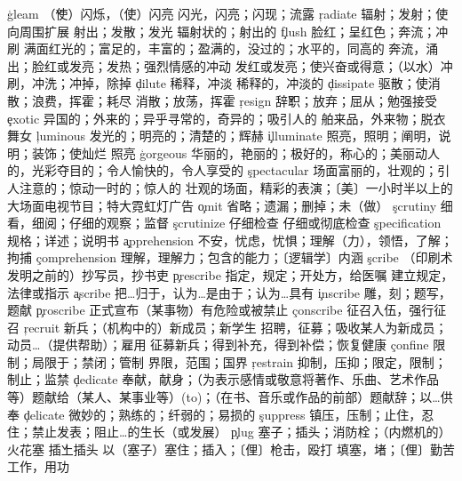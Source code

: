 \begin{multicols}{2}
\c{gleam}  \v （使）闪烁，（使）闪亮 \n 闪光，闪亮；闪现；流露
\c{radiate}  \vt 辐射；发射；使向周围扩展 \vi 射出；发散；发光 \a 辐射状的；射出的
\c{flush}  \vi 脸红；呈红色；奔流；冲刷 \a 满面红光的；富足的，丰富的；盈满的，没过的；水平的，同高的 \n 奔流，涌出；脸红或发亮；发热；强烈情感的冲动 \vt 发红或发亮；使兴奋或得意；（以水）冲刷，冲洗；冲掉，除掉
\c{dilute}  \vt 稀释，冲淡 \a 稀释的，冲淡的 
\c{dissipate}  \vt 驱散；使消散；浪费，挥霍；耗尽 \vi 消散；放荡，挥霍
\c{resign}  \v 辞职；放弃；屈从；勉强接受
\c{exotic}  \a 异国的；外来的；异乎寻常的，奇异的；吸引人的 \n 舶来品，外来物；脱衣舞女
\c{luminous}  \a 发光的；明亮的；清楚的；辉赫
\c{illuminate}  \vt 照亮，照明；阐明，说明；装饰；使灿烂 \vi 照亮
\c{gorgeous}  \a 华丽的，艳丽的；极好的，称心的；美丽动人的，光彩夺目的；令人愉快的，令人享受的
\c{spectacular}  \a 场面富丽的，壮观的；引人注意的；惊动一时的；惊人的 \n 壮观的场面，精彩的表演；〔美〕一小时半以上的大场面电视节目；特大霓虹灯广告
\c{omit}  \vt 省略；遗漏；删掉；未（做）
\c{scrutiny}  \n 细看，细阅；仔细的观察；监督
\c{scrutinize}  \vt 仔细检查 \n 仔细或彻底检查
\c{specification}  \n 规格；详述；说明书
\c{apprehension}  \n 不安，忧虑，忧惧；理解（力），领悟，了解；拘捕
\c{comprehension}  \n 理解，理解力；包含的能力；〔逻辑学〕内涵
\c{scribe}  \n （印刷术发明之前的）抄写员，抄书吏
\c{prescribe}  \vt 指定，规定；开处方，给医嘱 \vi 建立规定，法律或指示
\c{ascribe}  \vt 把…归于，认为…是由于；认为…具有 
\c{inscribe}  \vt 雕，刻；题写，题献
\c{proscribe}  \vt 正式宣布（某事物）有危险或被禁止
\c{conscribe}  \vt 征召入伍，强行征召
\c{recruit}  \n 新兵；（机构中的）新成员；新学生 \vt 招聘，征募；吸收某人为新成员；动员…（提供帮助）；雇用 \vi 征募新兵；得到补充，得到补偿；恢复健康
\c{confine}  \vt 限制；局限于；禁闭；管制 \n 界限，范围；国界
\c{restrain}  \vt 抑制，压抑；限定，限制；制止；监禁
\c{dedicate}  \vt 奉献，献身；（为表示感情或敬意将著作、乐曲、艺术作品等）题献给（某人、某事业等）(to)；（在书、音乐或作品的前部）题献辞；以…供奉
\c{delicate}  \a 微妙的；熟练的；纤弱的；易损的
\c{suppress}  \vt 镇压，压制；止住，忍住；禁止发表；阻止…的生长（或发展）
\c{plug}  \n 塞子；插头；消防栓；（内燃机的）火花塞 \v 插上插头 \vt 以（塞子）塞住；插入；〔俚〕枪击，殴打 \vi 填塞，堵；〔俚〕勤苦工作，用功

\end{multicols}
